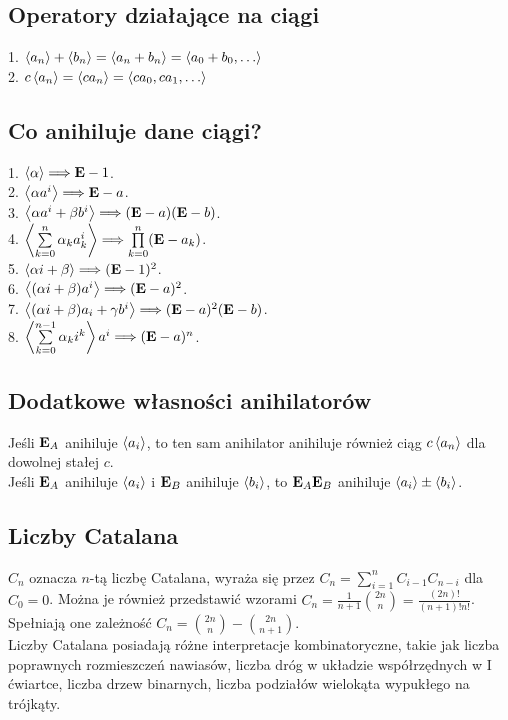 \subsection*{Operatory działające na ciągi}
1. $\left\langle a_n \right\rangle + \left\langle b_n \right\rangle = \left\langle a_n + b_n \right\rangle = \left\langle a_0 + b_0, 
\ldots \right\rangle$ \\
2. $c \left\langle a_n \right\rangle = \left\langle c a_n \right\rangle = \left\langle ca_0, ca_1, \ldots \right\rangle$

\subsection*{Co anihiluje dane ciągi?}
1. $\left\langle \alpha \right\rangle \Longrightarrow \mathbf{E} - 1$. \\
2. $\left\langle \alpha a^i \right\rangle \Longrightarrow \mathbf{E} - a$. \\
3. $\left\langle \alpha a^i + \beta b^i \right\rangle \Longrightarrow (\mathbf{E} - a)(\mathbf{E} - b)$. \\
4. $\left\langle \sum\limits_{k=0}^{n} \alpha_k a_k^i \right\rangle \Longrightarrow  
\prod\limits_{k=0}^{n} (\mathbf{E} - a_k)$. \\
5. $\left\langle \alpha i + \beta \right\rangle \Longrightarrow (\mathbf{E} - 1)^2$. \\
6. $\left\langle (\alpha i + \beta) a^i \right\rangle \Longrightarrow (\mathbf{E} - a)^2$. \\
7. $\left\langle (\alpha i + \beta) a_i + \gamma b^i \right\rangle \Longrightarrow 
(\mathbf{E} - a)^2 (\mathbf{E} - b)$. \\
8. $\left\langle \sum\limits_{k=0}^{n-1} \alpha_k i^k \right\rangle a^i \Longrightarrow 
(\mathbf{E} - a)^n$. \\

\subsection*{Dodatkowe własności anihilatorów}
Jeśli $\mathbf{E}_A$ anihiluje $\left\langle a_i \right\rangle$, to ten sam anihilator anihiluje
również ciąg $c \left\langle a_n \right\rangle$ dla dowolnej stałej $c$. \\
Jeśli $\mathbf{E}_A$ anihiluje $\left\langle a_i \right\rangle$ i $\mathbf{E}_B$ anihiluje
$\left\langle b_i \right\rangle$, to $\mathbf{E}_A \mathbf{E}_B$ anihiluje
$\left\langle a_i \right\rangle \pm \left\langle b_i \right\rangle$.

\subsection*{Liczby Catalana}
$C_n$ oznacza $n$-tą liczbę Catalana, wyraża się przez 
$C_n = \sum\limits_{i=1}^{n} C_{i-1} C_{n-i}$ dla $C_0 = 0$. Można je również
przedstawić wzorami $C_n = \frac{1}{n+1} \binom{2n}{n} = \frac{(2n)!}{(n+1)!n!}$.
Spełniają one zależność $C_n = \binom{2n}{n} - \binom{2n}{n+1}$. \\
Liczby Catalana posiadają różne interpretacje kombinatoryczne, takie jak
liczba poprawnych rozmieszczeń nawiasów, liczba dróg w układzie współrzędnych
w I ćwiartce, liczba drzew binarnych, liczba podziałów wielokąta wypukłego na trójkąty.

